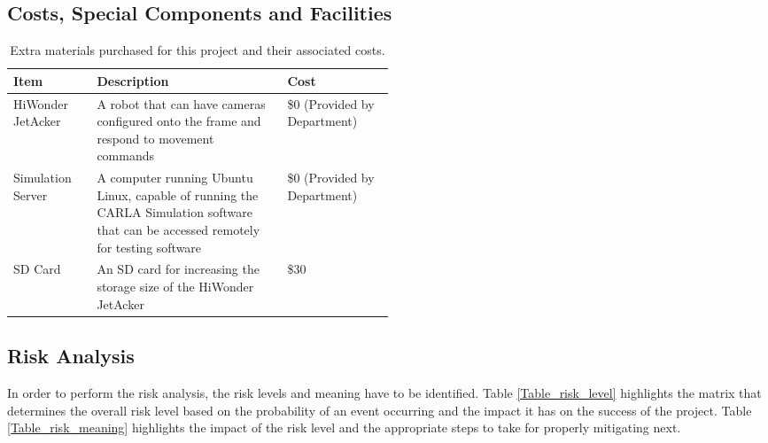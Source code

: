 \documentclass[titlepage,draft]{article}
\begin{document}
\subsection{Costs, Special Components and Facilities}
\begin{table}[H]
	\centering
	\begin{tabular}{@{}lp{0.5\linewidth}l@{}}
		\toprule
		\textbf{Item}     & \textbf{Description}                                                                                                                 & \textbf{Cost}                \\ \midrule
		HiWonder JetAcker & A robot that can have cameras configured onto the frame and respond to movement commands                                             & \$0 (Provided by Department) \\ \midrule
		Simulation Server & A computer running Ubuntu Linux, capable of running the CARLA Simulation software that can be accessed remotely for testing software & \$0 (Provided by Department) \\ \midrule
		SD Card           & An SD card for increasing the storage size of the HiWonder JetAcker                                                                  & \$30                         \\ \bottomrule
	\end{tabular}
	\caption{Extra materials purchased for this project and their associated costs.}
	\label{tab:costs}
\end{table}

\subsection{Risk Analysis}

In order to perform the risk analysis, the risk levels and meaning have to be identified. Table \ref{Table_risk_level} highlights the matrix that determines the overall risk level based on the probability of an event occurring and the impact it has on the success of the project. Table \ref{Table_risk_meaning} highlights the impact of the risk level and the appropriate steps to take for properly mitigating next.
\end{document}
